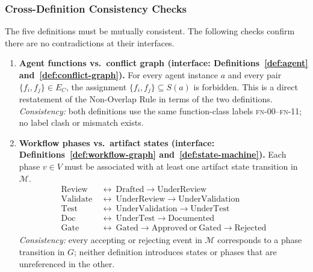 \documentclass[12pt]{article}
\theoremstyle{definition}
\newcommand{\FN}[1]{\textsc{fn-#1}}
\begin{document}
\subsubsection{Cross-Definition Consistency Checks}
\label{sec:val-cross}

The five definitions must be mutually consistent.
The following checks confirm there are no contradictions at
their interfaces.

\begin{enumerate}[label=\textbf{X\arabic*.}, leftmargin=*, widest=X9]

  \item \textbf{Agent functions vs.\ conflict graph (interface:
        Definitions~\ref{def:agent} and~\ref{def:conflict-graph}).}
        For every agent instance $a$ and every pair
        $\{f_i, f_j\} \in E_C$, the assignment
        $\{f_i, f_j\} \subseteq S(a)$ is forbidden.
        This is a direct restatement of the Non-Overlap Rule in
        terms of the two definitions.
        \emph{Consistency:} both definitions use the same
        function-class labels \FN{00}--\FN{11}; no label clash
        or mismatch exists.

  \item \textbf{Workflow phases vs.\ artifact states (interface:
        Definitions~\ref{def:workflow-graph}
        and~\ref{def:state-machine}).}
        Each phase $v \in V$ must be associated with at least one
        artifact state transition in $\mathcal{M}$.
        \begin{align*}
          \mathrm{Review}\ &\leftrightarrow\
            \mathrm{Drafted} \to \mathrm{UnderReview} \\
          \mathrm{Validate}\ &\leftrightarrow\
            \mathrm{UnderReview} \to \mathrm{UnderValidation} \\
          \mathrm{Test}\ &\leftrightarrow\
            \mathrm{UnderValidation} \to \mathrm{UnderTest} \\
          \mathrm{Doc}\ &\leftrightarrow\
            \mathrm{UnderTest} \to \mathrm{Documented} \\
          \mathrm{Gate}\ &\leftrightarrow\
            \mathrm{Gated} \to \mathrm{Approved}\ \text{or}\
            \mathrm{Gated} \to \mathrm{Rejected}
        \end{align*}
        \emph{Consistency:} every accepting or rejecting event in
        $\mathcal{M}$ corresponds to a phase transition in $G$;
        neither definition introduces states or phases that are
        unreferenced in the other.


\end{enumerate}
\end{document}
